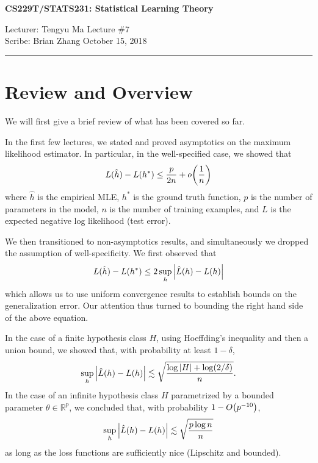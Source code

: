 \documentclass[11pt]{article}
\newcommand\R{\mathbb R}
\newcommand{\draftnotice}{\vbox to 0.25in{\noindent
   \raisebox{0.6in}[0in][0in]{\makebox[\textwidth][r]{\it
    DRAFT --- a final version will be posted shortly}}}
   \vspace{-.25in}\vspace{-\baselineskip}
}
\begin{document}
\thispagestyle{empty}


\begin{center}
\bf\large CS229T/STATS231: Statistical Learning Theory
\end{center}

\noindent
Lecturer: Tengyu Ma   %
\hfill
Lecture \#7               %
\\
Scribe: Brian Zhang                  %
\hfill
October 15, 2018           %

\noindent
\rule{\textwidth}{1pt}

\medskip


\section{Review and Overview}

We will first give a brief review of what has been covered so far.

In the first few lectures, we stated and proved asymptotics on the maximum likelihood estimator. In particular, in the well-specified case, we showed that 
\begin{align}
L(\hat h) - L(h^*) \le \frac{p}{2n} + o\qty(\frac 1n)
\end{align}
where $\hat h$ is the empirical MLE, $h^*$ is the ground truth function, $p$ is the number of parameters in the model, $n$ is the number of training examples, and $L$ is the expected negative log likelihood (test error).

We then transitioned to non-asymptotics results, and simultaneously we dropped the assumption of well-specificity. We first observed that 
\begin{align}\label{unif-convergence}
L(\hat h) - L(h^*) \le 2 \sup_h \abs{\hat L(h) - L(h)}
\end{align}
which allows us to use uniform convergence results to establish bounds on the generalization error. Our attention thus turned to bounding the right hand side of the above equation.

In the case of a finite hypothesis class $H$, using Hoeffding's inequality and then a union bound, we showed that, with probability at least $1 - \delta$, 
\begin{align}
\sup_h \abs{\hat L(h) - L(h)} \lesssim \sqrt{\frac{\log \abs{H} + \log(2/\delta)}{n}}.
\end{align}
In the case of an infinite hypothesis class $H$ parametrized by a bounded parameter $\theta \in \R^p$, we concluded that, with probability $1 - O\qty(p^{-10})$,
\begin{align}
\sup_h \abs{\hat L(h) - L(h)} \lesssim \sqrt{\frac{p \log n}{n}}
\end{align}
as long as the loss functions are sufficiently nice (Lipschitz and bounded).
\end{document}
